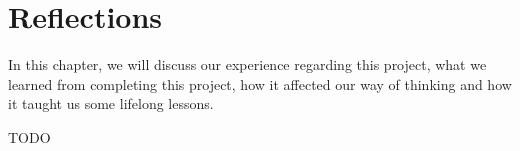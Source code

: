 \chapter{Reflections} 
\label{chap8}

In this chapter, we will discuss our experience regarding this project, what we learned from completing this project, how it affected our way of thinking and how it taught us some lifelong lessons.

TODO
